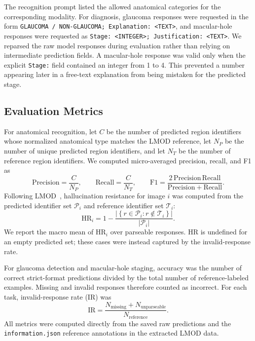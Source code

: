 The recognition prompt listed the allowed anatomical categories for the
corresponding modality.  For diagnosis, glaucoma responses were requested in
the form \texttt{GLAUCOMA / NON-GLAUCOMA; Explanation: <TEXT>}, and
macular-hole responses were requested as
\texttt{Stage: <INTEGER>; Justification: <TEXT>}.  We reparsed the raw model
responses during evaluation rather than relying on intermediate prediction
fields.  A macular-hole response was valid only when the explicit
\texttt{Stage:} field contained an integer from 1 to 4.  This prevented a
number appearing later in a free-text explanation from being mistaken for the
predicted stage.

\subsection{Evaluation Metrics}

For anatomical recognition, let $C$ be the number of predicted region
identifiers whose normalized anatomical type matches the LMOD reference, let
$N_P$ be the number of unique predicted region identifiers, and let $N_T$ be
the number of reference region identifiers.  We computed micro-averaged
precision, recall, and F1 as
\begin{equation}
    \mathrm{Precision}=\frac{C}{N_P},\qquad
    \mathrm{Recall}=\frac{C}{N_T},\qquad
    \mathrm{F1}=\frac{2\,\mathrm{Precision}\,\mathrm{Recall}}
    {\mathrm{Precision}+\mathrm{Recall}}.
\end{equation}
Following LMOD~\cite{qin2025lmod}, hallucination resistance for image $i$ was
computed from the predicted identifier set $\mathcal{P}_i$ and reference
identifier set $\mathcal{T}_i$:
\begin{equation}
    \mathrm{HR}_i = 1-
    \frac{\left|\left\{r\in\mathcal{P}_i:r\notin\mathcal{T}_i\right\}\right|}
    {|\mathcal{P}_i|}.
\end{equation}
We report the macro mean of $\mathrm{HR}_i$ over parseable responses.  HR is
undefined for an empty predicted set; these cases were instead captured by
the invalid-response rate.

For glaucoma detection and macular-hole staging, accuracy was the number of
correct strict-format predictions divided by the total number of
reference-labeled examples.  Missing and invalid responses therefore counted
as incorrect.  For each task, invalid-response rate (IR) was
\begin{equation}
    \mathrm{IR}=\frac{N_{\mathrm{missing}}+N_{\mathrm{unparseable}}}
    {N_{\mathrm{reference}}}.
\end{equation}
All metrics were computed directly from the saved raw predictions and the
\texttt{information.json} reference annotations in the extracted LMOD data.

